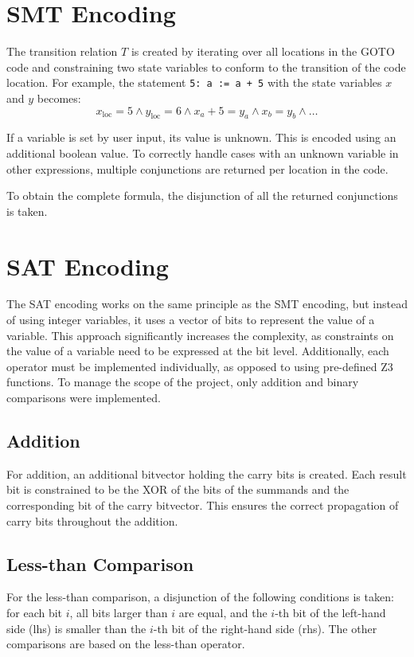 \documentclass[sigconf,natbib=false]{acmart}
\begin{document}
\section{SMT Encoding}
The transition relation \( T \) is created by iterating over all locations in the GOTO code and constraining two state variables to conform to the transition of the code location. For example, the statement \texttt{5: a := a + 5} with the state variables \( x \) and \( y \) becomes:
\[
x_{\text{loc}} = 5 \wedge y_{\text{loc}} = 6 \wedge x_a + 5 = y_a \wedge x_b = y_b \wedge \ldots
\]

If a variable is set by user input, its value is unknown. This is encoded using an additional boolean value. To correctly handle cases with an unknown variable in other expressions, multiple conjunctions are returned per location in the code.

To obtain the complete formula, the disjunction of all the returned conjunctions is taken.

\section{SAT Encoding}
The SAT encoding works on the same principle as the SMT encoding, but instead of using integer variables, it uses a vector of bits to represent the value of a variable. This approach significantly increases the complexity, as constraints on the value of a variable need to be expressed at the bit level. Additionally, each operator must be implemented individually, as opposed to using pre-defined Z3 functions. To manage the scope of the project, only addition and binary comparisons were implemented.

\subsection{Addition}
For addition, an additional bitvector holding the carry bits is created. Each result bit is constrained to be the XOR of the bits of the summands and the corresponding bit of the carry bitvector. This ensures the correct propagation of carry bits throughout the addition.

\subsection{Less-than Comparison}
For the less-than comparison, a disjunction of the following conditions is taken: for each bit \( i \), all bits larger than \( i \) are equal, and the \( i \)-th bit of the left-hand side (lhs) is smaller than the \( i \)-th bit of the right-hand side (rhs). The other comparisons are based on the less-than operator.
\end{document}
